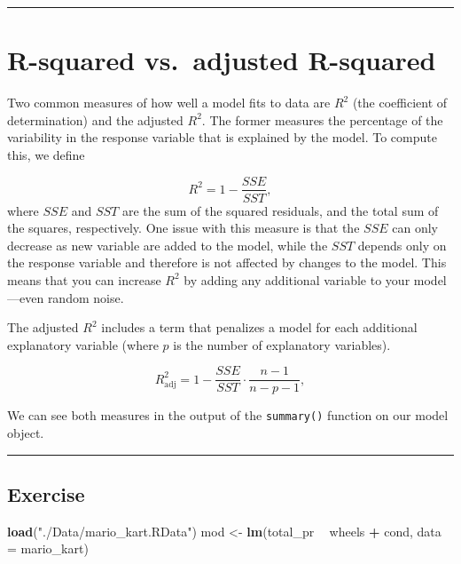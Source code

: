 \documentclass[
]{book}
\newenvironment{Shaded}{\begin{snugshade}}{\end{snugshade}}
\newcommand{\DataTypeTok}[1]{\textcolor[rgb]{0.13,0.29,0.53}{#1}}
\newcommand{\KeywordTok}[1]{\textcolor[rgb]{0.13,0.29,0.53}{\textbf{#1}}}
\newcommand{\NormalTok}[1]{#1}
\newcommand{\OperatorTok}[1]{\textcolor[rgb]{0.81,0.36,0.00}{\textbf{#1}}}
\newcommand{\StringTok}[1]{\textcolor[rgb]{0.31,0.60,0.02}{#1}}
\begin{document}
\begin{center}\rule{0.5\linewidth}{0.5pt}\end{center}

\hypertarget{r-squared-vs.-adjusted-r-squared}{%
\section{R-squared vs.~adjusted R-squared}\label{r-squared-vs.-adjusted-r-squared}}

Two common measures of how well a model fits to data are \(R^2\) (the coefficient of determination) and the adjusted \(R^2\). The former measures the percentage of the variability in the response variable that is explained by the model. To compute this, we define

\[R^2 = 1 − \frac{SSE}{SST},\]
where \(SSE\) and \(SST\) are the sum of the squared residuals, and the total sum of the squares, respectively. One issue with this measure is that the \(SSE\) can only decrease as new variable are added to the model, while the \(SST\) depends only on the response variable and therefore is not affected by changes to the model. This means that you can increase \(R^2\) by adding any additional variable to your model---even random noise.

The adjusted \(R^2\) includes a term that penalizes a model for each additional explanatory variable (where \(p\) is the number of explanatory variables).

\[R^2_{\text{adj}} = 1 − \frac{SSE}{SST}\cdot\frac{n-1}{n-p-1},\]

We can see both measures in the output of the \texttt{summary()} function on our model object.

\begin{center}\rule{0.5\linewidth}{0.5pt}\end{center}

\hypertarget{exercise-4}{%
\subsection*{Exercise}\label{exercise-4}}

\begin{Shaded}
\begin{Highlighting}[]
\KeywordTok{load}\NormalTok{(}\StringTok{"./Data/mario_kart.RData"}\NormalTok{)}
\NormalTok{mod <-}\StringTok{ }\KeywordTok{lm}\NormalTok{(total_pr }\OperatorTok{~}\StringTok{ }\NormalTok{wheels }\OperatorTok{+}\StringTok{ }\NormalTok{cond, }\DataTypeTok{data =}\NormalTok{ mario_kart)}
\end{Highlighting}
\end{Shaded}
\end{document}
